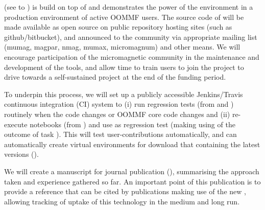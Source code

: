 \begin{workpackage}[id=dissem,wphases=18-48!.5,
  title=Dissemination,
  SARM=1,
  USORM=10,
  USHRM=8,
  USRM=24
]
\begin{tasklist}
\begin{task}[id=dissemination-of-oommf-nb-virtual-environment,
  title=Open source dissemination of \OOMMFNB{} virtual environment]
  \OOMMFNB{} (see  to
  ) is build on top of \TheProject and demonstrates the power
  of the environment in a production environment of active OOMMF users. 
  The source code of \OOMMFNB{} will be made available as open source on
  public repository hosting sites (such as github/bitbucket), and
  announced to the community via appropriate mailing list (mumag,
  magpar, nmag, mumax, micromagnum) and other means. We will
  encourage participation of the micromagnetic community in the
  maintenance and development of the tools, and allow time to train
  users to join the \OOMMFNB{} project to drive towards a self-sustained
  \OOMMFNB{} project at the end of the funding period.

  To underpin this process, we will set up a publicly accessible
  Jenkins/Travis continuous integration (CI) system to (i) run
  regression tests (from  and ) routinely when the
  \OOMMFNB{} code changes or OOMMF core code changes and (ii)
  re-execute notebooks (from
  ) and use
  as regression test (making using of the outcome of task ). This will
  test user-contributions automatically, and can automatically create virtual environments
  for download that containing the latest versions ().

  We will create a manuscript for journal publication (), summarising the
  approach taken and experience gathered so far. An important point of
  this publication is to provide a reference that can be cited by
  publications making use of the new \OOMMFNB, allowing tracking of
  uptake of this technology in the medium and long run.
\end{task}

\begin{task}[title=\OOMMFNB{} open source dissemination workshops,
id=dissemination-of-oommf-nb-workshops]




\end{task}
\end{tasklist}
\end{workpackage}

